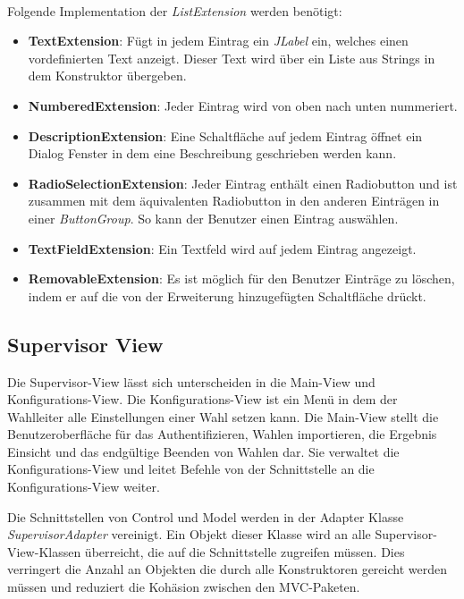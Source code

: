 \documentclass[parskip=full]{scrartcl}
\newcommand{\textitx}[1]{\mbox{\textit{#1}}}
\newcommand{\fakeparagraph}[1]{\textbf{#1}}
\begin{document}
		\\
		Folgende Implementation der \textitx{ListExtension} werden benötigt:
		\begin{itemize}
			\item\fakeparagraph{TextExtension}: Fügt in jedem Eintrag ein \textitx{JLabel} ein, welches einen vordefinierten Text anzeigt. Dieser Text wird über ein Liste aus Strings in dem Konstruktor übergeben.
			\item\fakeparagraph{NumberedExtension}: Jeder Eintrag wird von oben nach unten nummeriert.
			\item\fakeparagraph{DescriptionExtension}: Eine Schaltfläche auf jedem Eintrag öffnet ein Dialog Fenster in dem eine Beschreibung geschrieben werden kann.
			\item\fakeparagraph{RadioSelectionExtension}: Jeder Eintrag enthält einen Radiobutton und ist zusammen mit dem äquivalenten Radiobutton in den anderen Einträgen in einer \textitx{ButtonGroup}. So kann der Benutzer einen Eintrag auswählen.
			\item\fakeparagraph{TextFieldExtension}: Ein Textfeld wird auf jedem Eintrag angezeigt.
			\item\fakeparagraph{RemovableExtension}: Es ist möglich für den Benutzer Einträge zu löschen, indem er auf die von der Erweiterung hinzugefügten Schaltfläche drückt.
		\end{itemize}
	
		\subsection{Supervisor View}
		Die Supervisor-View lässt sich unterscheiden in die Main-View und Konfigurations-View. Die Konfigurations-View ist ein Menü in dem der Wahlleiter alle Einstellungen einer Wahl setzen kann. Die Main-View stellt die Benutzeroberfläche für das Authentifizieren, Wahlen importieren, die Ergebnis Einsicht und das endgültige Beenden von Wahlen dar. Sie verwaltet die Konfigurations-View und leitet Befehle von der Schnittstelle an die Konfigurations-View weiter.
		
		Die Schnittstellen von Control und Model werden in der Adapter Klasse \textitx{SupervisorAdapter} vereinigt. Ein Objekt dieser Klasse wird an alle Supervisor-View-Klassen überreicht, die auf die Schnittstelle zugreifen müssen. Dies verringert die Anzahl an Objekten die durch alle Konstruktoren gereicht werden müssen und reduziert die Kohäsion zwischen den MVC-Paketen.
		
\end{document}
